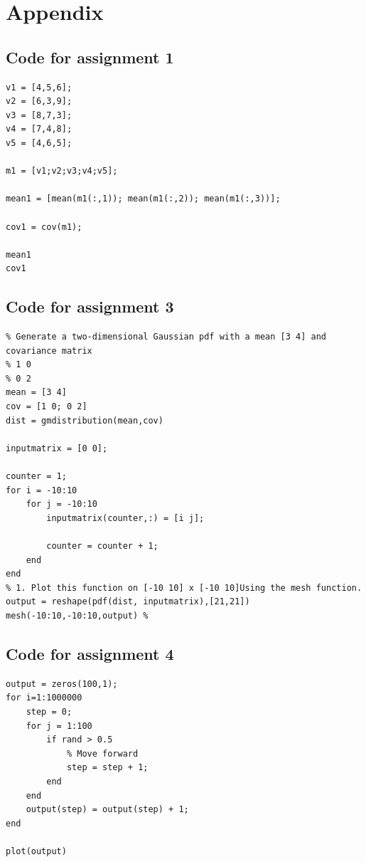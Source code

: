 \documentclass[10pt]{article}
\begin{document}
\section*{Appendix}
\subsection*{Code for assignment 1}
\begin{lstlisting}
v1 = [4,5,6];
v2 = [6,3,9];
v3 = [8,7,3];
v4 = [7,4,8];
v5 = [4,6,5];

m1 = [v1;v2;v3;v4;v5];

mean1 = [mean(m1(:,1)); mean(m1(:,2)); mean(m1(:,3))];

cov1 = cov(m1);

mean1
cov1
\end{lstlisting}

\subsection*{Code for assignment 3}
\begin{lstlisting}
% Generate a two-dimensional Gaussian pdf with a mean [3 4] and covariance matrix  
% 1 0
% 0 2
mean = [3 4]
cov = [1 0; 0 2]
dist = gmdistribution(mean,cov)

inputmatrix = [0 0];

counter = 1;
for i = -10:10
    for j = -10:10
        inputmatrix(counter,:) = [i j];
        
        counter = counter + 1;
    end
end
% 1. Plot this function on [-10 10] x [-10 10]Using the mesh function.
output = reshape(pdf(dist, inputmatrix),[21,21])
mesh(-10:10,-10:10,output) % 
\end{lstlisting}

\subsection*{Code for assignment 4}
\begin{lstlisting}
output = zeros(100,1);
for i=1:1000000
    step = 0;
    for j = 1:100
        if rand > 0.5
            % Move forward
            step = step + 1;
        end
    end
    output(step) = output(step) + 1;
end

plot(output)
\end{lstlisting}
\end{document}

